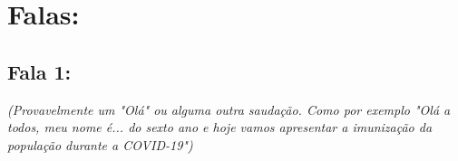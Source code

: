 \section{Falas:}
\subsection{Fala 1:}
\textit{(Provavelmente um "Olá" ou alguma outra saudação. Como por exemplo "Olá a todos, meu nome é... do sexto ano e hoje vamos apresentar a imunização da população durante a COVID-19")}